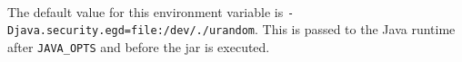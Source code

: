 
\noindent\\The default value for this environment variable is 
\texttt{-Djava.security.egd=file:/dev/./urandom}.  This is passed to the Java runtime
after \texttt{JAVA\_OPTS} and before the \cxflow jar is executed.  
